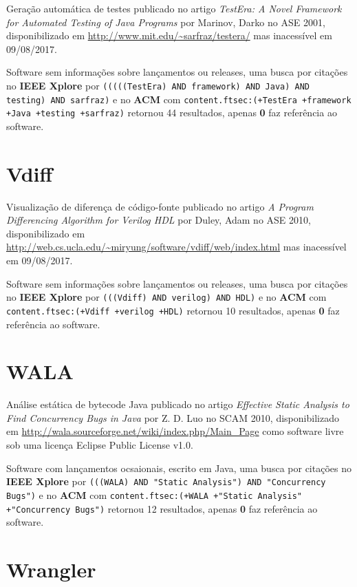 Geração automática de testes
publicado no artigo {\it TestEra: A Novel Framework for Automated Testing of Java Programs}
por Marinov, Darko
no ASE 2001,
disponibilizado em \url{http://www.mit.edu/~sarfraz/testera/}
mas inacessível em 09/08/2017.

Software sem informações sobre lançamentos ou releases,
uma busca por citações no {\bf IEEE Xplore} por
\texttt{(((((TestEra) AND framework) AND Java) AND testing) AND sarfraz)}
e no {\bf ACM} com
\texttt{content.ftsec:(+TestEra +framework +Java +testing +sarfraz)}
retornou
44 resultados, apenas
{\bf 0} faz referência ao software.



\section{Vdiff}

Visualização de diferença de código-fonte
publicado no artigo {\it A Program Differencing Algorithm for Verilog HDL}
por Duley, Adam
no ASE 2010,
disponibilizado em \url{http://web.cs.ucla.edu/~miryung/software/vdiff/web/index.html}
mas inacessível em 09/08/2017.

Software sem informações sobre lançamentos ou releases,
uma busca por citações no {\bf IEEE Xplore} por
\texttt{(((Vdiff) AND verilog) AND HDL)}
e no {\bf ACM} com
\texttt{content.ftsec:(+Vdiff +verilog +HDL)}
retornou
10 resultados, apenas
{\bf 0} faz referência ao software.



\section{WALA}

Análise estática de bytecode Java
publicado no artigo {\it Effective Static Analysis to Find Concurrency Bugs in Java}
por Z. D. Luo
no SCAM 2010,
disponibilizado em \url{http://wala.sourceforge.net/wiki/index.php/Main_Page}
como software livre
sob uma licença Eclipse Public License v1.0.

Software com lançamentos ocsaionais,
escrito em Java,
uma busca por citações no {\bf IEEE Xplore} por
\texttt{(((WALA) AND "Static Analysis") AND "Concurrency Bugs")}
e no {\bf ACM} com
\texttt{content.ftsec:(+WALA +"Static Analysis" +"Concurrency Bugs")}
retornou
12 resultados, apenas
{\bf 0} faz referência ao software.



\section{Wrangler}

